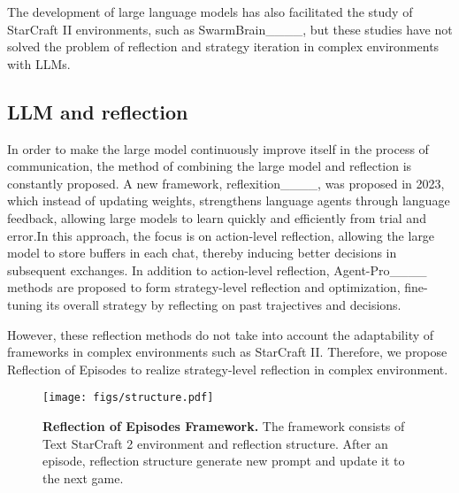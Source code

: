 The development of large language models has also facilitated the study of StarCraft II environments, such as SwarmBrain____, but these studies have not solved the problem of reflection and strategy iteration in complex environments with LLMs.


\subsection{LLM and reflection}
In order to make the large model continuously improve itself in the process of communication, the method of combining the large model and reflection is constantly proposed. A new framework, reflexition____, was proposed in 2023, which instead of updating weights, strengthens language agents through language feedback, allowing large models to learn quickly and efficiently from trial and error.In this approach, the focus is on action-level reflection, allowing the large model to store buffers in each chat, thereby inducing better decisions in subsequent exchanges.
In addition to action-level reflection, Agent-Pro____ methods are proposed to form strategy-level reflection and optimization, fine-tuning its overall strategy by reflecting on past trajectives and decisions.

However, these reflection methods do not take into account the adaptability of frameworks in complex environments such as StarCraft II. Therefore, we propose Reflection of Episodes to realize strategy-level reflection in complex environment.

%
%
%
%
\begin{figure}[htbp]
\centerline{\texttt{[image: figs/structure.pdf]}}
\caption{\textbf{Reflection of Episodes Framework.} The framework consists of Text StarCraft 2 environment and reflection structure. After an episode, reflection structure generate new prompt and update it to the next game.} \label{fig2}
\end{figure}